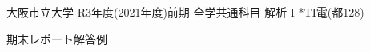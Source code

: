 \documentclass[dvipdfmx,a4paper,11pt]{article}
\newcommand{\R}{\mathbb{R}}
\theoremstyle{definition}
\newcommand{\pdrv}[2]{\frac{\partial #1}{\partial #2}}
\begin{document}

     




  

 \newpage
 
 \begin{center}
{ \large 大阪市立大学 R3年度(2021年度)前期 全学共通科目 解析 I *TI電(都128)} \\
\vspace{5pt}

{\LARGE 期末レポート解答例} \\
\vspace{5pt}

\end{center}
\end{document}
